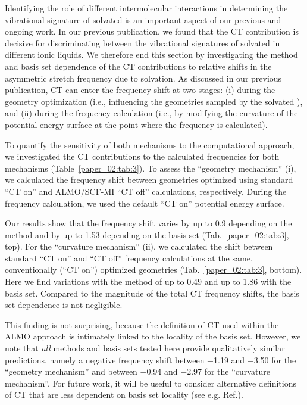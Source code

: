Identifying the role of different intermolecular interactions in determining the vibrational signature of solvated  is an important aspect of our previous and ongoing work.\cite{Brinzer2015,Ramos-Cordoba2011,Lambrecht2011c} In our previous publication,\cite{Brinzer2015} we found that the CT contribution is decisive for discriminating between the vibrational signatures of  solvated in different ionic liquids. We therefore end this section by investigating the method and basis set dependence of the CT contributions to relative shifts in the  asymmetric stretch frequency due to solvation. As discussed in our previous publication,\cite{Brinzer2015} CT can enter the frequency shift at two stages: (i) during the geometry optimization (i.e., influencing the geometries sampled by the solvated ), and (ii) during the frequency calculation (i.e., by modifying the curvature of the potential energy surface at the point where the frequency is calculated).

To quantify the sensitivity of both mechanisms to the computational approach, we investigated the CT contributions to the calculated frequencies for both mechanisms (Table~\ref{paper_02:tab:3}). To assess the ``geometry mechanism'' (i), we calculated the frequency shift between geometries optimized using standard ``CT on'' and ALMO/SCF-MI ``CT off'' calculations, respectively. During the frequency calculation, we used the default ``CT on'' potential energy surface.

Our results show that the frequency shift varies by up to \SI{0.9}{\wavenumber} depending on the method and by up to \SI{1.53}{\wavenumber} depending on the basis set (Tab.~\ref{paper_02:tab:3}, top). For the ``curvature mechanism'' (ii), we calculated the shift between standard ``CT on'' and ``CT off'' frequency calculations at the same, conventionally (``CT on'') optimized geometries (Tab.~\ref{paper_02:tab:3}, bottom). Here we find variations with the method of up to \SI{0.49}{\wavenumber} and up to \SI{1.86}{\wavenumber} with the basis set. Compared to the magnitude of the total CT frequency shifts, the basis set dependence is not negligible.

This finding is not surprising, because the definition of CT used within the ALMO approach is intimately linked to the locality of the basis set. However, we note that \emph{all} methods and basis sets tested here provide qualitatively similar predictions, namely a negative frequency shift between \num{-1.19} and \SI{-3.50}{\wavenumber} for the ``geometry mechanism'' and between \num{-0.94} and \SI{-2.97}{\wavenumber} for the ``curvature mechanism''. For future work, it will be useful to consider alternative definitions of CT that are less dependent on basis set locality (see e.g. Ref.\cite{Lao2016a}).

